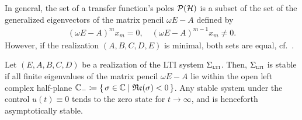 \begin{remark}
    In general, the set of a transfer function's poles $\mathcal{P}(\mathcal{H})$ is a subset of the set of the generalized eigenvectors of the matrix pencil $\omega E - A$ defined by
    \begin{align*}
        {(\omega E - A)}^m x_m = 0,\quad {(\omega E - A)}^{m - 1} x_m \neq 0.
    \end{align*}
    However, if the realization $(A, B, C, D, E)$ is minimal, both sets are equal, cf.~\cite[Section~2]{Benner2017}.
\end{remark}

\begin{definition}\label{def:lti-stability}
    Let $(E, A, B, C, D)$ be a realization of the \ac{LTI} system $\Sigma_{\textnormal{\scshape lti}}$.
    Then, $\Sigma_{\textnormal{\scshape lti}}$ is stable if all finite eigenvalues of the matrix pencil $\omega E - A$ lie within the open left complex half-plane $\mathbb{C}_{-} \coloneqq \left\{\,\sigma \in \mathbb{C}\mid\mathfrak{Re}(\sigma) < 0\,\right\}$.
    Any stable system under the control $u(t) \equiv 0$ tends to the zero state for $t \to \infty$, and is henceforth asymptotically stable.
\end{definition}
